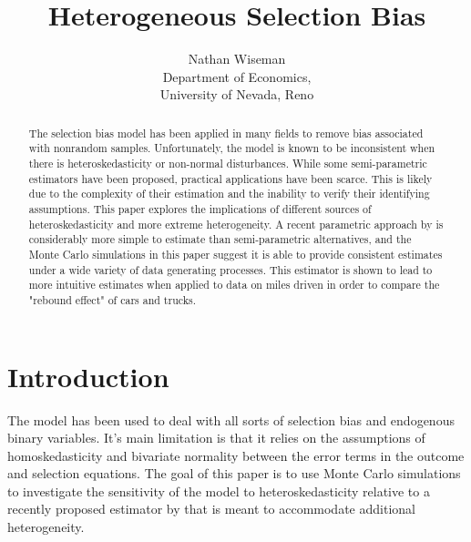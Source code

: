 \documentclass{article}
\begin{document}
\title{Heterogeneous Selection Bias}
\author{Nathan Wiseman \\Department of Economics,\\University of Nevada, Reno}
\maketitle
\begin{abstract}
The \citet{heckman1979} selection bias model has been applied in many fields to remove bias associated with nonrandom samples.  Unfortunately, the model is known to be inconsistent when there is heteroskedasticity or non-normal disturbances.  While some semi-parametric estimators have been proposed, practical applications have been scarce.  This is likely due to the complexity of their estimation and the inability to verify their identifying assumptions. This paper explores the implications of different sources of heteroskedasticity and more extreme heterogeneity.  A recent parametric approach by \citet{reichert2014} is considerably more simple to estimate than semi-parametric alternatives, and the Monte Carlo simulations in this paper suggest it is able to provide consistent estimates under a wide variety of data generating processes.  This estimator is shown to lead to more intuitive estimates when applied to data on miles driven in order to compare the "rebound effect" of cars and trucks.

\end{abstract}
\newpage


\section{Introduction}
The \citet{heckman1979} model has been used to deal with all sorts of selection bias and endogenous binary variables.  It's main limitation is that it relies on the assumptions of homoskedasticity and bivariate normality between the error terms in the outcome and selection equations.  The goal of this paper is to use Monte Carlo simulations to investigate the sensitivity of the \citet{heckman1979} model to heteroskedasticity relative to a recently proposed estimator by \citet{reichert2014} that is meant to accommodate additional heterogeneity.  
\end{document}
